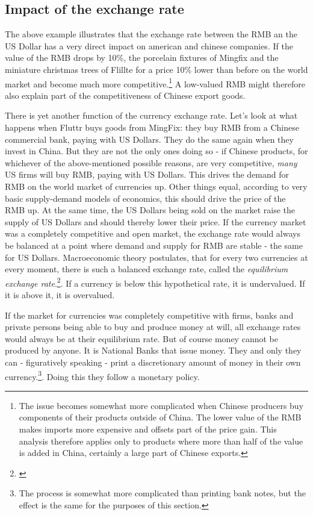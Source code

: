 \documentclass[11pt]{article}
\begin{document}
\subsection{Impact of the exchange rate}

The above example illustrates that the exchange rate between the RMB an the US Dollar has 
a very direct impact on american and chinese companies. If the value of the RMB drops by 10\%, the porcelain fixtures of Mingfix and the miniature christmas trees of Flillte for a price 10\% lower than before on the world market and become much more competitive.\footnote{The issue becomes somewhat more complicated when Chinese producers buy components of their products outside of China. The lower value of the RMB makes imports more expensive and offsets part of the price gain. This analysis therefore applies only to products where more than half of the value is added in China, certainly a large part of Chinese exports.} A low-valued RMB might therefore also explain part of the competitiveness of Chinese export goods. 

There is yet another function of the currency exchange rate. Let's look at what happens when Fluttr buys goods from MingFix: they buy RMB from a Chinese commercial bank, paying with US Dollars. They do the same again when they invest in China. But they are not the only ones doing so - if Chinese products, for whichever of the above-mentioned possible reasons, are very competitive, \emph{many} US firms will buy RMB, paying with US Dollars. This drives the demand for RMB on the world market of currencies up. Other things equal, according to very basic supply-demand models of economics, this should drive the price of the RMB up. At the same time, the US Dollars being sold on the market raise the supply of US Dollars and should thereby lower their price. If the currency market was a completely competitive and open market, the exchange rate would always be balanced at a point where demand and supply for RMB are stable - the same for US Dollars. Macroeconomic theory postulates, that for every two currencies at every 
moment, there is such a balanced exchange rate, called the \emph{equilibrium exchange rate}.\footnote{\cite[p. ?]{Krugman}}. If a currency is below this hypothetical rate, it is undervalued. If it is above it, it is overvalued.

If the market for currencies was completely competitive with firms, banks and private persons being able to buy and produce money at will, all exchange rates would always be at their equilibrium rate. But of course money cannot be produced by anyone. It is National Banks that issue money. They and only they can - figuratively speaking - print a discretionary amount of money in their own 
currency.\footnote{The process is somewhat more complicated than 
printing bank notes, but the effect is the same for the purposes of this 
section.}. Doing this they follow a monetary policy. 
\end{document}
